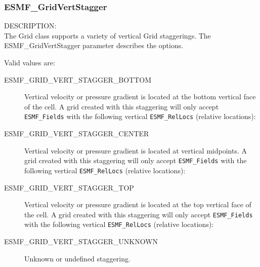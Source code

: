  \subsubsection{ESMF\_GridVertStagger}

 {\sf DESCRIPTION:\\}
 The Grid class supports a variety of vertical Grid staggerings.  The
 {ESMF\_GridVertStagger} parameter describes the options.

 Valid values are:
 \begin{description}

    \item [ESMF\_GRID\_VERT\_STAGGER\_BOTTOM]
          Vertical velocity or pressure gradient is located at the bottom vertical 
          face of the cell.  A grid created with this staggering will only accept
          {\tt ESMF\_Fields} with the following vertical {\tt ESMF\_RelLocs}
          (relative locations):

    \item [ESMF\_GRID\_VERT\_STAGGER\_CENTER] 
          Vertical velocity or pressure gradient is located at vertical midpoints.
          A grid created with this staggering will only accept {\tt ESMF\_Fields}
          with the following vertical {\tt ESMF\_RelLocs} (relative locations):

    \item [ESMF\_GRID\_VERT\_STAGGER\_TOP]
          Vertical velocity or pressure gradient is located at the top vertical 
          face of the cell.  A grid created with this staggering will only accept
          {\tt ESMF\_Fields} with the following vertical {\tt ESMF\_RelLocs}
          (relative locations):

    \item [ESMF\_GRID\_VERT\_STAGGER\_UNKNOWN]
          Unknown or undefined staggering.

 \end{description}


